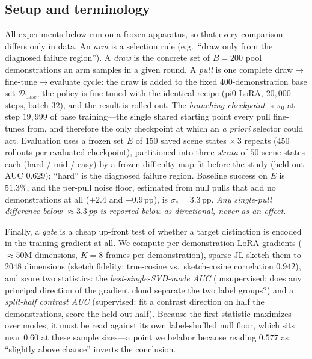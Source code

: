 \subsection{Setup and terminology}
\label{sec:grad_setup}
All experiments below run on a frozen apparatus, so that every comparison
differs only in data. An \emph{arm} is a selection rule (e.g.\ ``draw only from
the diagnosed failure region''). A \emph{draw} is the concrete set of $B{=}200$
pool demonstrations an arm samples in a given round. A \emph{pull} is one
complete draw$\rightarrow$fine-tune$\rightarrow$evaluate cycle: the draw is
added to the fixed $400$-demonstration base set $\mathcal{D}_{\text{base}}$, the
policy is fine-tuned with the identical recipe (pi0 LoRA, $20{,}000$ steps,
batch $32$), and the result is rolled out. The \emph{branching checkpoint} is
$\pi_0$ at step $19{,}999$ of base training---the single shared starting point
every pull fine-tunes from, and therefore the only checkpoint at which an
\emph{a priori} selector could act. Evaluation uses a frozen set $E$ of $150$
saved scene states $\times\,3$ repeats ($450$ rollouts per evaluated
checkpoint), partitioned into three \emph{strata} of $50$ scene states each
(hard / mid / easy) by a frozen difficulty map fit before the study
(held-out AUC $0.629$); ``hard'' is the diagnosed failure region. Baseline
success on $E$ is $51.3\%$, and the per-pull noise floor, estimated from
null pulls that add no demonstrations at all ($+2.4$ and $-0.9$\,pp), is
$\sigma_e = 3.3$\,pp. \emph{Any single-pull difference below $\approx$$3.3$\,pp
is reported below as directional, never as an effect.}

Finally, a \emph{gate} is a cheap up-front test of whether a target distinction
is encoded in the training gradient at all. We compute per-demonstration LoRA
gradients ($\approx$$50$M dimensions, $K{=}8$ frames per demonstration),
sparse-JL sketch them to $2048$ dimensions (sketch fidelity: true-cosine vs.\
sketch-cosine correlation $0.942$), and score two statistics: the
\emph{best-single-SVD-mode AUC} (unsupervised: does any principal direction of
the gradient cloud separate the two label groups?) and a \emph{split-half
contrast AUC} (supervised: fit a contrast direction on half the demonstrations,
score the held-out half). Because the first statistic maximizes over modes, it
must be read against its own label-shuffled null floor, which sits near $0.60$
at these sample sizes---a point we belabor because reading $0.577$ as
``slightly above chance'' inverts the conclusion.

